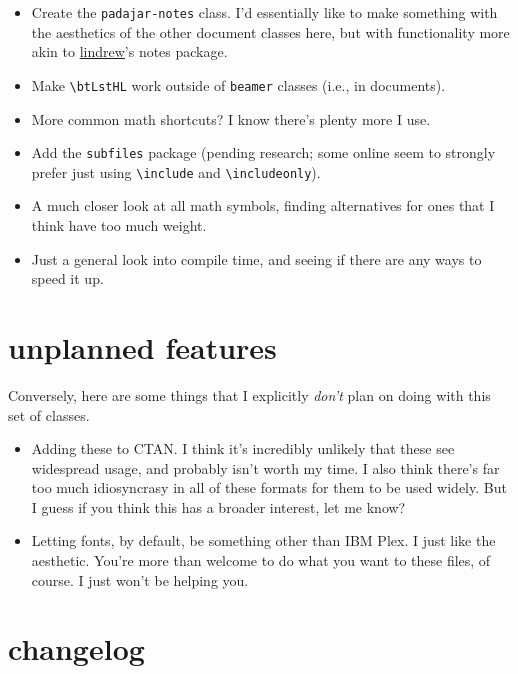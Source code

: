 \documentclass[11pt]{padajar-memo}
\newcommand{\ttslash}[1]{\texttt{\textbackslash #1}}
\begin{document}
\begin{itemize}
	\item Create the \texttt{padajar-notes} class. I'd essentially like to make something with the aesthetics of the other document classes here, but with functionality more akin to \href{https://web.stanford.edu/~lindrew/index.html}{lindrew}'s notes package.
	\item Make \ttslash{btLstHL} work outside of \texttt{beamer} classes (i.e., in documents).
	\item More common math shortcuts? I know there's plenty more I use.
	\item Add the \texttt{subfiles} package (pending research; some online seem to strongly prefer just using \ttslash{include} and \ttslash{includeonly}).
	\item A much closer look at all math symbols, finding alternatives for ones that I think have too much weight.
	\item Just a general look into compile time, and seeing if there are any ways to speed it up.
\end{itemize}

\section{unplanned features}

Conversely, here are some things that I explicitly \textit{don't} plan on doing with this set of classes.

\begin{itemize}
	\item Adding these to CTAN. I think it's incredibly unlikely that these see widespread usage, and probably isn't worth my time. I also think there's far too much idiosyncrasy in all of these formats for them to be used widely. But I guess if you think this has a broader interest, let me know?
	\item Letting fonts, by default, be something other than IBM Plex. I just like the aesthetic. You're more than welcome to do what you want to these files, of course. I just won't be helping you.
\end{itemize}

\appendix

\section{changelog}
\end{document}
